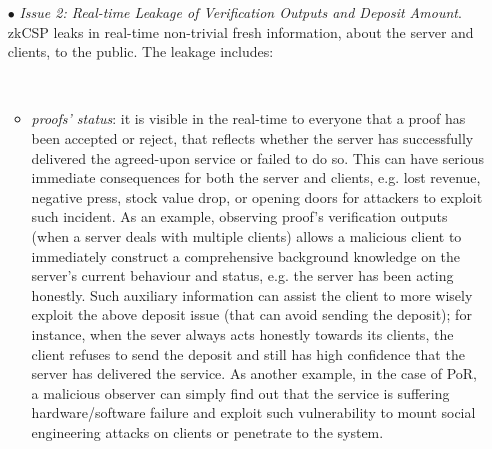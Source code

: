 \begin{itemize}
\

\item[$\bullet$]\textit{Issue 2: Real-time Leakage of Verification Outputs and Deposit Amount}. zkCSP leaks in real-time non-trivial fresh information,  about  the server and clients, to the public. The leakage includes:

\
\begin{itemize}
 \item\textit{proofs' status}: it is visible in the real-time to everyone that a proof has been accepted or reject, that reflects whether  the server has successfully delivered the agreed-upon service or failed to do so. This can have serious immediate consequences for both the server and clients, e.g. lost revenue, negative press, stock value drop, or opening doors for attackers to exploit such incident. As an example, observing  proof's verification outputs (when a server deals with multiple clients) allows a malicious client to immediately construct a comprehensive background knowledge on the server's current behaviour and status, e.g. the server has been  acting honestly.  Such auxiliary information can assist the  client to more wisely exploit the above deposit issue (that can avoid sending the deposit); for instance, when the sever always acts honestly towards its clients, the client refuses to send the deposit and still  has  high confidence that the server has delivered the service. As another example, in the case of PoR, a malicious observer can  simply find out that the service is suffering hardware/software failure and exploit such vulnerability to  mount   social engineering attacks on clients or penetrate to the system. 

 \
 

\end{itemize}
\end{itemize}
